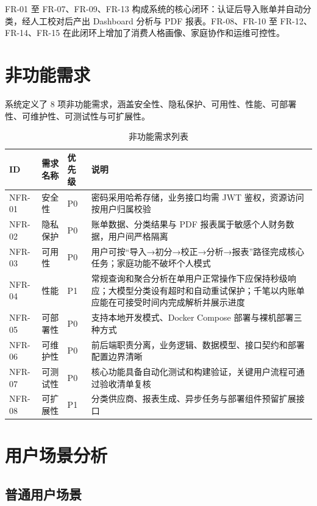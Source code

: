 \endgroup

FR-01 至 FR-07、FR-09、FR-13 构成系统的核心闭环：认证后导入账单并自动分类，经人工校对后产出 Dashboard 分析与 PDF 报表。FR-08、FR-10 至 FR-12、FR-14、FR-15 在此闭环上增加了消费人格画像、家庭协作和运维可控性。

\section{非功能需求}

系统定义了 8 项非功能需求，涵盖安全性、隐私保护、可用性、性能、可部署性、可维护性、可测试性与可扩展性。

\begin{table}[H]
\centering
\caption{非功能需求列表}
\label{tab:nfr}
\begin{tabular}{p{1.5cm} p{3cm} p{1cm} p{7.8cm}}
\toprule
\textbf{ID} & \textbf{需求名称} & \textbf{优先级} & \textbf{说明} \\
\midrule
NFR-01 & 安全性 & P0 & 密码采用哈希存储，业务接口均需 JWT 鉴权，资源访问按用户归属校验 \\
\hline
NFR-02 & 隐私保护 & P0 & 账单数据、分类结果与 PDF 报表属于敏感个人财务数据，用户间严格隔离 \\
\hline
NFR-03 & 可用性 & P0 & 用户可按“导入→初分→校正→分析→报表”路径完成核心任务；家庭功能不破坏个人模式 \\
\hline
NFR-04 & 性能 & P1 & 常规查询和聚合分析在单用户正常操作下应保持秒级响应；大模型分类设有超时和自动重试保护；千笔以内账单应能在可接受时间内完成解析并展示进度 \\
\hline
NFR-05 & 可部署性 & P0 & 支持本地开发模式、Docker Compose 部署与裸机部署三种方式 \\
\hline
NFR-06 & 可维护性 & P0 & 前后端职责分离，业务逻辑、数据模型、接口契约和部署配置边界清晰 \\
\hline
NFR-07 & 可测试性 & P0 & 核心功能具备自动化测试和构建验证，关键用户流程可通过验收清单复核 \\
\hline
NFR-08 & 可扩展性 & P1 & 分类供应商、报表生成、异步任务与部署组件预留扩展接口 \\
\bottomrule
\end{tabular}
\end{table}

\section{用户场景分析}

\subsection{普通用户场景}

